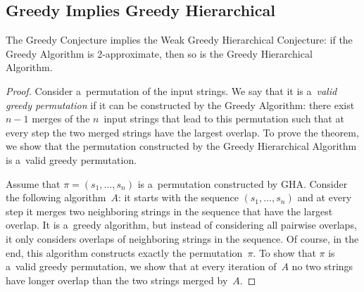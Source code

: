 \subsection{Greedy Implies Greedy Hierarchical}
\label{sec:gr_im_wghc}
\begin{theorem}
\label{thm:gr_im_wghc}
The Greedy Conjecture implies the Weak Greedy Hierarchical Conjecture: if the Greedy Algorithm is 2-approximate, then so is the Greedy Hierarchical Algorithm.
\end{theorem}
\begin{proof}
Consider a~permutation of the input strings. We say that it is a~{\em valid greedy permutation} if it can be constructed by the Greedy Algorithm: there exist $n-1$ merges of the $n$~input strings that lead to this permutation such that at every step the two merged strings have the largest overlap. To prove the theorem, we show that the permutation constructed by the Greedy Hierarchical Algorithm is a~valid greedy permutation.

Assume that $\pi=(s_1, \dots, s_n)$ is a~permutation constructed by GHA. Consider the following algorithm~$A$: it starts with the sequence $(s_1, \dots, s_n)$ and at every step it merges two neighboring strings in the sequence that have the largest overlap. It is a~greedy algorithm, but instead of considering all pairwise overlaps, it only considers overlaps of neighboring strings in the sequence. Of course, in the end, this algorithm constructs exactly the permutation~$\pi$. To show that $\pi$ is a~valid greedy permutation, we show that at every iteration of~$A$ no two strings have longer overlap than the two strings merged by~$A$.


\end{proof}
